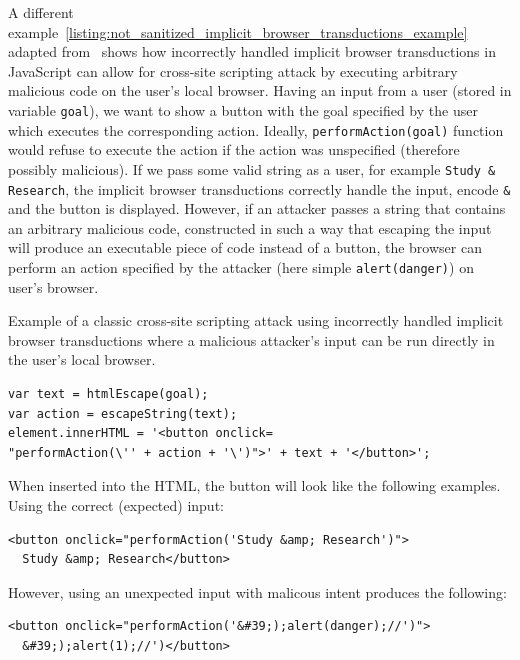 A different example~\ref{listing:not_sanitized_implicit_browser_transductions_example} adapted from~\cite{kern14} shows how incorrectly handled implicit browser transductions in JavaScript can allow for cross-site scripting attack by executing arbitrary malicious code on the user's local browser.
Having an input from a user (stored in variable \texttt{goal}), we want to show a button with the goal specified by the user which executes the corresponding action. Ideally, \texttt{performAction(goal)} function would refuse to execute the action if the action was unspecified (therefore possibly malicious).
If we pass some valid string as a user, for example \texttt{Study \& Research}, the implicit browser transductions correctly handle the input, encode \texttt{\&} and the button is displayed.
However, if an attacker passes a string that contains an arbitrary malicious code, constructed in such a way that escaping the input will produce an executable piece of code instead of a button, the browser can perform an action specified by the attacker (here simple \texttt{alert(danger)}) on user's browser.

\begin{listing}[!ht]
\caption{Example of a classic cross-site scripting attack using incorrectly handled implicit browser transductions where a malicious attacker's input can be run directly in the user's local browser.}
\label{listing:not_sanitized_implicit_browser_transductions_example}

    \begin{verbatim}
var text = htmlEscape(goal);
var action = escapeString(text);
element.innerHTML = '<button onclick=
"performAction(\'' + action + '\')">' + text + '</button>';
    \end{verbatim}

    When inserted into the HTML, the button will look like the following examples.
    Using the correct (expected) input:
    \begin{verbatim}
<button onclick="performAction('Study &amp; Research')">
  Study &amp; Research</button>
    \end{verbatim}

    However, using an unexpected input with malicous intent produces the following:

    \begin{verbatim}
<button onclick="performAction('&#39;);alert(danger);//')">
  &#39;);alert(1);//')</button>
    \end{verbatim}
\end{listing}


